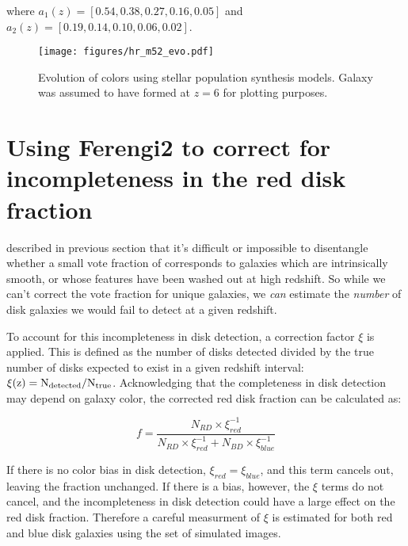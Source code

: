 where $a_{1}(z) = [0.54,0.38,0.27,0.16,0.05]$ and $a_{2}(z) = [0.19,0.14,0.10,0.06,0.02]$. 

\begin{figure}
\centering
\texttt{[image: figures/hr\_m52\_evo.pdf]} 
\caption{Evolution of colors using stellar population synthesis models. Galaxy was assumed to have formed at $z=6$ for plotting purposes.}
\label{fig:bcmodel}
\end{figure}

\section{Using Ferengi2 to correct for incompleteness in the red disk fraction}

described in previous section that it's difficult or impossible to disentangle whether a small vote fraction of \ffeatures corresponds to galaxies which are intrinsically smooth, or whose features have been washed out at high redshift. So while we can't correct the vote fraction for unique galaxies, we \emph{can} estimate the \emph{number} of disk galaxies we would fail to detect at a given redshift. 

To account for this incompleteness in disk detection, a correction factor $\xi$ is applied. This is defined as the number of disks detected divided by the true number of disks expected to exist in a given redshift interval: $\rm \xi(z)=N_{detected}/N_{true}$. Acknowledging that the completeness in disk detection may depend on galaxy color, the corrected red disk fraction can be calculated as:

\begin{equation}
f=\frac{N_{RD}\times \xi^{-1}_{red}}{N_{RD}\times \xi^{-1}_{red} + N_{BD} \times \xi^{-1}_{blue}}
\label{eqn:reddiskfraction}
\end{equation}

If there is no color bias in disk detection, $\xi_{red}=\xi_{blue}$, and this term cancels out, leaving the fraction unchanged. If there is a bias, however, the $\xi$ terms do not cancel, and the incompleteness in disk detection could have a large effect on the red disk fraction. Therefore a careful measurment of $\xi$ is estimated for both red and blue disk galaxies using the  set of simulated images.

